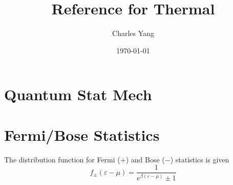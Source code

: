 \documentclass{article}
\title{\vspace{-1.5cm}Reference for Thermal\vspace{-1em}}
\author{Charles Yang}
\date{\vspace{-1em} \today \vspace{-2em}}
\begin{document}
\maketitle

\setlength{\multicolsep}{4pt}
\setlength{\parskip}{0pt}
\setlength{\abovedisplayshortskip}{2pt}
\setlength{\belowdisplayshortskip}{0pt}
\setlength{\abovedisplayskip}{2pt}
\setlength{\belowdisplayskip}{0pt}

\section{Quantum Stat Mech}


\section{Fermi/Bose Statistics}
The distribution function for Fermi (\(+\)) and Bose (\(-\)) statistics is given
\begin{equation}
	f_\pm(\varepsilon-\mu) = \frac{1}{e^{\beta(\varepsilon-\mu)}\pm 1}
\end{equation}
\end{document}
